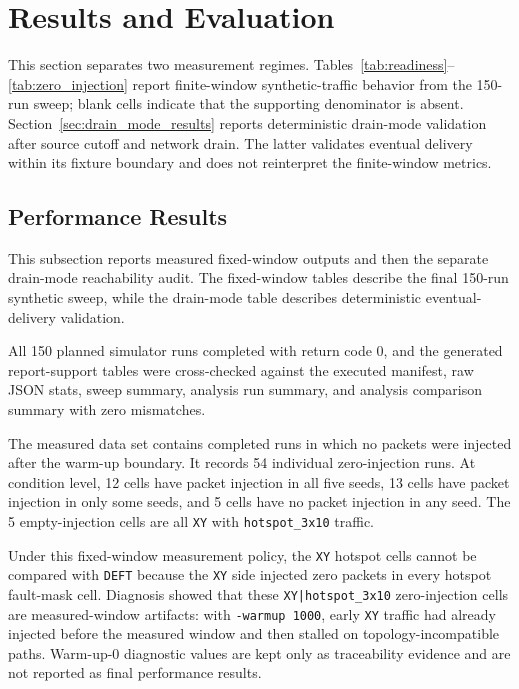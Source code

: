 \documentclass[conference]{IEEEtran}
\begin{document}
\section{Results and Evaluation}

This section separates two measurement regimes. Tables~\ref{tab:readiness}--\ref{tab:zero_injection} report finite-window synthetic-traffic behavior from the 150-run sweep; blank cells indicate that the supporting denominator is absent. Section~\ref{sec:drain_mode_results} reports deterministic drain-mode validation after source cutoff and network drain. The latter validates eventual delivery within its fixture boundary and does not reinterpret the finite-window metrics.

\subsection{Performance Results}

This subsection reports measured fixed-window outputs and then the separate drain-mode reachability audit. The fixed-window tables describe the final 150-run synthetic sweep, while the drain-mode table describes deterministic eventual-delivery validation.

All 150 planned simulator runs completed with return code 0, and the generated report-support tables were cross-checked against the executed manifest, raw JSON stats, sweep summary, analysis run summary, and analysis comparison summary with zero mismatches.

The measured data set contains completed runs in which no packets were injected after the warm-up boundary. It records 54 individual zero-injection runs. At condition level, 12 cells have packet injection in all five seeds, 13 cells have packet injection in only some seeds, and 5 cells have no packet injection in any seed. The 5 empty-injection cells are all \texttt{XY} with \texttt{hotspot\_3x10} traffic.

Under this fixed-window measurement policy, the \texttt{XY} hotspot cells cannot be compared with \texttt{DEFT} because the \texttt{XY} side injected zero packets in every hotspot fault-mask cell. Diagnosis showed that these \texttt{XY|hotspot\_3x10} zero-injection cells are measured-window artifacts: with \texttt{-warmup 1000}, early \texttt{XY} traffic had already injected before the measured window and then stalled on topology-incompatible paths. Warm-up-0 diagnostic values are kept only as traceability evidence and are not reported as final performance results.
\end{document}
